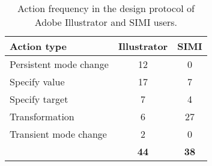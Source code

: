 
\begin{table}[h]
  \centering
  \begin{tabular}{ l c c }
    \textbf{Action type} & \textbf{Illustrator} & \textbf{SIMI} \\
    \hline
    Persistent mode change & 12 & 0 \\
    Specify value & 17 & 7 \\
    Specify target & 7 & 4 \\
    Transformation & 6 & 27 \\
    Transient mode change & 2 & 0 \\
    \hline
    & \textbf{44} & \textbf{38} \\
  \end{tabular}
  \caption[Action Frequency]{Action frequency in the design protocol
    of Adobe Illustrator and SIMI users. }
  \label{tab:expert}
\end{table}

